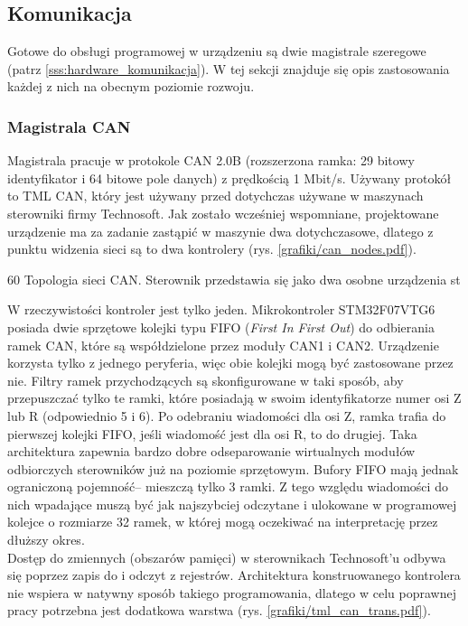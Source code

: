\subsection{Komunikacja}

Gotowe do obsługi programowej w urządzeniu są dwie magistrale szeregowe (patrz \ref{sss:hardware_komunikacja}). W tej sekcji znajduje się opis zastosowania każdej z nich na obecnym poziomie rozwoju.

\subsubsection{Magistrala CAN}
\label{ss:hwcan}

Magistrala pracuje w protokole CAN 2.0B (rozszerzona ramka: 29 bitowy identyfikator i 64 bitowe pole danych) z prędkością 1 Mbit/s. Używany protokół to TML CAN, który jest używany przed dotychczas używane w maszynach sterowniki firmy Technosoft. Jak zostało wcześniej wspomniane, projektowane urządzenie ma za zadanie zastąpić w maszynie dwa dotychczasowe, dlatego z punktu widzenia sieci są to dwa kontrolery (rys. \ref{grafiki/can_nodes.pdf}).

	{60}
	{Topologia sieci CAN. Sterownik przedstawia się jako dwa osobne urządzenia}
	{st}
	
W rzeczywistości kontroler jest tylko jeden. Mikrokontroler STM32F07VTG6 posiada dwie sprzętowe kolejki typu FIFO ({\it First In First Out}) do odbierania ramek CAN, które są współdzielone przez moduły CAN1 i CAN2. Urządzenie korzysta tylko z jednego peryferia, więc obie kolejki mogą być zastosowane przez nie. Filtry ramek przychodzących są skonfigurowane w taki sposób, aby przepuszczać tylko te ramki, które posiadają w swoim identyfikatorze numer osi Z lub R (odpowiednio 5 i 6). Po odebraniu wiadomości dla osi Z, ramka trafia do pierwszej kolejki FIFO, jeśli wiadomość jest dla osi R, to do drugiej. Taka architektura zapewnia bardzo dobre odseparowanie wirtualnych modułów odbiorczych sterowników już na poziomie sprzętowym. Bufory FIFO mają jednak ograniczoną pojemność-- mieszczą tylko 3 ramki. Z tego względu wiadomości do nich wpadające muszą być jak najszybciej odczytane i ulokowane w programowej kolejce o rozmiarze 32 ramek, w której mogą oczekiwać na interpretację przez dłuższy okres. \\

Dostęp do zmiennych (obszarów pamięci) w sterownikach Technosoft'u odbywa się poprzez zapis do i odczyt z rejestrów. Architektura konstruowanego kontrolera nie wspiera w natywny sposób takiego programowania, dlatego w celu poprawnej pracy potrzebna jest dodatkowa warstwa (rys. \ref{grafiki/tml_can_trans.pdf}).

